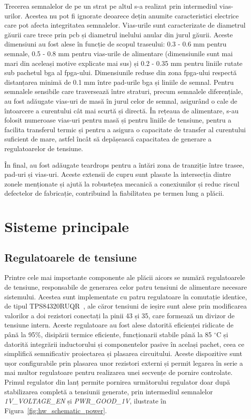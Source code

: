 \documentclass[12pt,a4paper]{report}
\begin{document}
Trecerea semnalelor de pe un strat pe altul s-a realizat prin intermediul vias-urilor. Acestea nu pot fi ignorate deoarece dețin anumite caracteristici electrice care pot afecta integritatea semnalelor. Vias-urile sunt caracterizate de diametrul găurii care trece prin \gls{pcb} și diametrul inelului anular din jurul găurii. Aceste dimensiuni au fost alese în funcție de scopul traseului: 0.3 - 0.6 mm pentru semnale, 0.5 - 0.8 mm pentru vias-urile de alimentare (dimensiunile sunt mai mari din aceleași motive explicate mai sus) și 0.2 - 0.35 mm pentru liniile rutate sub pachetul \gls{bga} al \gls{fpga}-ului. Dimensiunile reduse din zona \gls{fpga}-ului respectă distanțarea minimă de 0.1 mm între pad-urile \gls{bga} și liniile de semnal. Pentru semnalele sensibile care traversează între straturi, precum semnalele diferențiale, au fost adăugate vias-uri de masă în jurul celor de semnal, asigurând o cale de întoarcere a curentului cât mai scurtă și directă. În rețeaua de alimentare, s-au folosit numeroase vias-uri pentru masă și pentru liniile de tensiune, pentru a facilita transferul termic și pentru a asigura o capacitate de transfer al curentului suficient de mare, astfel încât să depășească capacitatea de generare a regulatoarelor de tensiune.

În final, au fost adăugate teardrops pentru a întări zona de tranziție între trasee, pad-uri și vias-uri. Aceste extensii de cupru sunt plasate la intersecția dintre zonele menționate și ajută la robustețea mecanică a conexiunilor și reduc riscul defectelor de fabricație, contribuind la fiabilitatea pe termen lung a plăcii.

\section{Sisteme principale}
\subsection{Regulatoarele de tensiune}
Printre cele mai importante componente ale plăcii \gls{aicors} se numără regulatoarele de tensiune, responsabile de generarea celor patru tensiuni de alimentare necesare sistemului. Acestea sunt implementate cu patru regulatoare în comutație identice, de tipul TPS84320RUQR~\cite{tps84320_datasheet}, ale căror tensiuni de ieșire sunt alese prin modificarea valorilor a doi rezistori conectați la pinii 43 și 35, care formează un divizor de tensiune intern. Aceste regulatoare au fost alese datorită eficienței ridicate de până la 95\%, disipării termice eficiente, funcționarii stabile până la 85 $^{\circ}$C și datorită integrării inductorului și componentelor pasive în același pachet, ceea ce simplifică semnificativ proiectarea și plasarea circuitului. Aceste dispozitive sunt ușor configurabile prin plasarea unor rezistori externi și permit legarea în serie a mai multor regulatoare pentru realizarea unei secvențe de pornire controlate. Primul regulator din lanț permite pornirea următorului regulator doar după stabilizarea completă a tensiunii generate, prin intermediul semnalelor \textit{1V\_VOLTAGE\_EN} și \textit{PWR\_GOOD\_1V}, ilustrate în Figura~\ref{fig:hw_schematic_power}.
\end{document}
